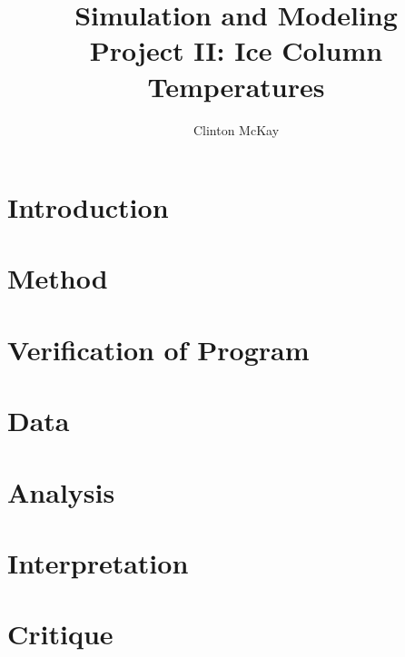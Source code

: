 \documentclass{article}%
\begin{document}
    \title{Simulation and Modeling\\Project II: Ice Column Temperatures}
    \author{Clinton McKay}
    \maketitle

    \twocolumn

    \section{Introduction}

    \section{Method}


    \section{Verification of Program}

    \section{Data}
    
    \section{Analysis}

    \section{Interpretation}

    \section{Critique} 

    \begin{thebibliography}{1}
    \end{thebibliography} 
\end{document}
